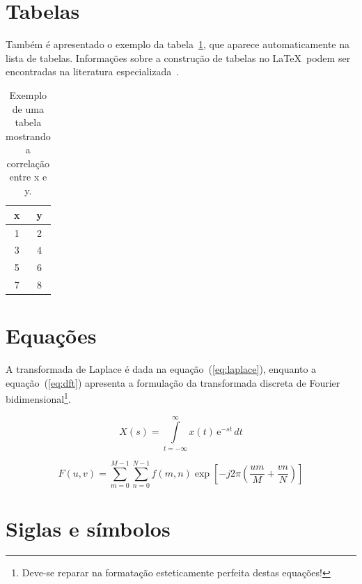 \documentclass[oneside]{normas-utf-tex} %
\begin{document}
\section{Tabelas}

Tamb\'em \'e apresentado o exemplo da tabela~\ref{tab:correlacao}, que aparece automaticamente na lista de tabelas. Informa\c{c}\~oes sobre a constru\c{c}\~ao de tabelas no \LaTeX\ podem ser encontradas na literatura especializada~\cite{Lamport1986,Buerger1989,Kopka2003,Mittelbach2004}.

\begin{table}[!htb]
	\centering
	\caption[Exemplo de uma tabela]{Exemplo de uma tabela mostrando a correla\c{c}\~ao entre x e y.}
	\label{tab:correlacao}
	\begin{tabular}{cc}
		\hline 
		x & y \\
		\hline
		1 & 2 \\
		3 & 4 \\
		5 & 6 \\
		7 & 8 \\
		\hline 
	\end{tabular}
\end{table}

\section{Equa\c{c}\~oes}

A transformada de Laplace \'e dada na equa\c{c}\~ao~(\ref{eq:laplace}), enquanto a equa\c{c}\~ao~(\ref{eq:dft}) apresenta a formula\c{c}\~ao da transformada discreta de Fourier bidimensional\footnote{Deve-se reparar na formata\c{c}\~ao esteticamente perfeita destas equa\c{c}\~oes!}.

\begin{equation}
X(s) = \int\limits_{t = -\infty}^{\infty} x(t) \, \text{e}^{-st} \, dt
\label{eq:laplace}
\end{equation}

\begin{equation}
F(u, v) = \sum_{m = 0}^{M - 1} \sum_{n = 0}^{N - 1} f(m, n) \exp \left[ -j 2 \pi \left( \frac{u m}{M} + \frac{v n}{N} \right) \right]
\label{eq:dft}
\end{equation}

\section{Siglas e s\'imbolos}
\end{document}
